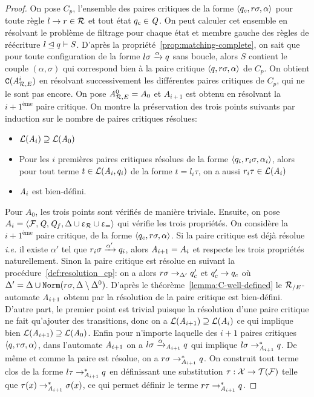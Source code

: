 \begin{proof}
  On pose $C_p$, l'ensemble des paires critiques de la forme $\langle q_c, r\sigma, \alpha\rangle$ pour toute règle $l\rightarrow r \in \mathcal R$ et tout état $q_c \in \mathit Q$.
  On peut calculer cet ensemble en résolvant le problème de filtrage pour chaque état et membre gauche des règles de réécriture $l \unlhd q \vdash S$.
  D'après la propriété~\ref{prop:matching-complete}, on sait que pour toute configuration de la forme $l\sigma \xrightarrow{\alpha} q$ sans boucle,
  alors $S$ contient le couple $(\alpha,\sigma)$ qui correspond bien à la paire critique $\langle q, r\sigma, \alpha \rangle$ de $C_p$.
  On obtient $\mathtt{C}({\mathit A}_{\mathcal R,E}^i)$ en résolvant successivement les différentes paires critiques de $C_p$, qui ne le sont pas encore.
  On pose ${\mathit A}_{\mathcal R,E}^0 = A_0$ et $A_{i+1}$ est obtenu en résolvant la $i+1^\text{ème}$ paire critique.
  On montre la préservation des trois points suivants par induction sur le nombre de paires critiques résolues:
  \begin{itemize}
  \item $\mathcal{L}(\mathit A_i) \supseteq \mathcal{L}(\mathit A_0)$
  \item Pour les $i$ premières paires critiques résolues de la forme $\langle q_i, r_i\sigma, \alpha_i\rangle$, alors
    pour tout terme $t \in \mathcal{L}(\mathit A_i, q_i)$ de la forme $t = l_i\tau$, on a aussi $r_i\tau \in \mathcal{L}(\mathit A_i)$
  \item $\mathit A_i$ est bien-défini.
  \end{itemize}
  \medskip
  \noindent
  Pour $A_0$, les trois points sont vérifiés de manière triviale. Ensuite, on pose
  $A_i = \langle \mathcal{F}, \mathit Q, \mathit Q_f, \Delta\cup\upvarepsilon_{\mathcal R}\cup\upvarepsilon_{=}\rangle$ qui vérifie les trois propriétés.
  On considère la $i+1^\text{ème}$ paire critique, de la forme $\langle q_c, r\sigma, \alpha\rangle$.
  Si la paire critique est déjà résolue \textit{i.e.} il existe $\alpha'$ tel que
  $r_i\sigma \xrightarrow{\alpha'} q_i$, alors $\mathit A_{i+1} = A_i$ et respecte les trois propriétés naturellement.
  Sinon la paire critique est résolue en suivant la procédure~\ref{def:resolution_cp}: on a alors
  $r\sigma \rightarrow_{\Delta'} q_c'$ et $q_c'\rightarrow q_c$ où $\Delta' = \Delta \cup \mathtt{Norm}(r\sigma,\Delta \setminus\Delta^0)$.
  D'après le théorème~\ref{lemma:C-well-defined} le ${\mathcal R_{/E}}$-automate $\mathit A_{i+1}$ obtenu par la résolution de la paire critique
  est bien-défini. D'autre part, le premier point est trivial puisque la résolution d'une paire critique ne fait qu'ajouter
  des transitions, donc on a $\mathcal{L}(\mathit A_{i+1}) \supseteq \mathcal{L}(\mathit A_i)$ ce qui implique bien $\mathcal{L}(\mathit A_{i+1}) \supseteq \mathcal{L}(\mathit A_0)$.
  Enfin pour n'importe laquelle des ${i+1}$ paires critiques $\langle q, r\sigma, \alpha\rangle$, dans l'automate $\mathit A_{i+1}$ on a
  $l\sigma \xrightarrow{\alpha}_{\mathit A_{i+1}} q$ qui implique $l\sigma \rightarrow_{\mathit A_{i+1}}^* q$. De même et comme la paire est résolue,
  on a $r\sigma \rightarrow_{\mathit A_{i+1}}^* q$. On construit tout terme clos de la forme $l\tau \rightarrow_{\mathit A_{i+1}}^* q$
  en définissant une substitution $\tau : \mathcal X \rightarrow \mathcal{T(F)}$ telle que $\tau(x) \rightarrow_{\mathit A_{i+1}}^* \sigma(x)$, ce qui permet 
  définir le terme $r\tau \rightarrow^*_{\mathit A_{i+1}} q$.


\end{proof}
